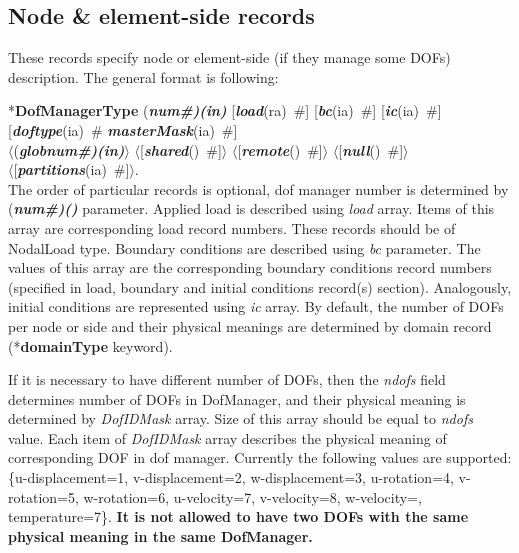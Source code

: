 \documentclass[draft]{article}
\newcommand{\param}[1]{{\em #1}}
\newcommand{\fieldVal}[2]{\mbox{({\it\bf{#1}\#)\tiny (#2)}}}
\newcommand{\keywordnotype}[1]{\mbox{{\it{\bf{#1}}}}}
\newcommand{\keyword}[2]{\mbox{{\keywordnotype{#1}\tiny (#2)}}}
\newcommand{\entKeyword}[1]{\mbox{{*{\bf{#1}}}}}
\newcommand{\field}[2]{\mbox{\keyword{#1}{#2}~\#}}
\newcommand{\optField}[2]{\mbox{[\field{#1}{#2}]}}
\newcommand{\PfieldVal}[2]{\mbox{$\langle$({\it\bf{#1}\#)\tiny (#2)}$\rangle$}}
\newcommand{\PoptField}[2]{\mbox{$\langle$[\field{#1}{#2}]$\rangle$}}
\begin{document}
\subsection{Node \& element-side records}
\label{_NodeElementSideRecords}
These records specify node or element-side (if they manage some DOFs) description. The general format is
following:

\noindent
\entKeyword{DofManagerType} \fieldVal{num}{in}
[\field{load}{ra}] \newline[\field{ndofs}{in}
\field{DofIDMask}{ia}]
\optField{bc}{ia}
\optField{ic}{ia} [\field{doftype}{ia} \field{masterMask}{ia}] \\ \PfieldVal{globnum}{in}
\PoptField{shared}{} \PoptField{remote}{} \PoptField{null}{}\\
 \PoptField{partitions}{ia}.\\

The order of particular records is optional, dof manager number is determined by \fieldVal{num}{} parameter. 
Applied load  is described using \param{load} array. Items of this array are
corresponding load record numbers. These records should be of NodalLoad type.
Boundary conditions are described using \param{bc} parameter. The
values of this array are the corresponding boundary conditions record
numbers (specified in load, boundary  and initial conditions record(s) section).
Analogously, initial conditions are
represented using \param{ic} array. 
By default, the number of DOFs per node or side  and their physical meanings are
determined by domain record (\entKeyword{domainType} keyword).

If it is necessary to have
different number of DOFs, then the \param{ndofs} field
determines number of DOFs in DofManager, and their physical meaning is
determined by \param{DofIDMask} array. Size of this array
should be equal to \param{ndofs} value. Each item of \param{DofIDMask}
array describes the physical meaning of corresponding DOF in dof manager. Currently
the following values are supported: \{u-displacement=1, v-displacement=2,
 w-displacement=3, u-rotation=4, v-ro\-ta\-tion=5, w-rotation=6, u-velocity=7, v-velocity=8, w-velocity=, 
temperature=7\}. {\bf It is not allowed to have two DOFs
with the same physical meaning in the same DofManager.}
\end{document}
